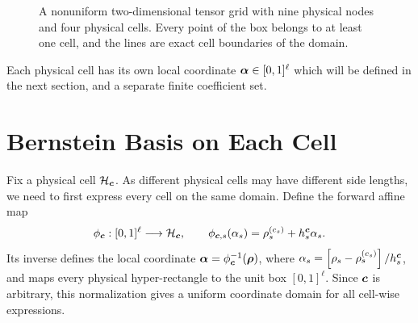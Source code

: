\begin{figure}[H]
    \centering
    \caption{A nonuniform two-dimensional tensor grid with nine physical nodes and four physical cells. Every point of the box belongs to at least one cell, and the lines are exact cell boundaries of the domain.}
    \label{fig:intro-two-dimensional-grid}
\end{figure}

Each physical cell has its own local coordinate $\boldsymbol{\alpha}\in[0,1]^\ell$ which will be defined in the next section, and a separate finite coefficient set.

\section[Bernstein Basis on Each Cell]{Bernstein Basis on Each Cell}
\label{sec:continuous-bernstein-representation}

Fix a physical cell $\mathcal H_{\boldsymbol{c}}$. As different physical cells may have different side lengths, we need to first express every cell on the same domain. Define the forward affine map
\begin{gather*}
    \phi_{\boldsymbol{c}}:[0,1]^\ell\longrightarrow\mathcal H_{\boldsymbol{c}},
    \qquad
    \phi_{\boldsymbol{c},s}(\alpha_s)
    =\rho_s^{(c_s)}+h_s^{\boldsymbol{c}}\alpha_s.
\end{gather*}
Its inverse defines the local coordinate $\boldsymbol{\alpha}=\phi_{\boldsymbol{c}}^{-1}(\boldsymbol{\rho})$, where $\alpha_s=\left[\rho_s-\rho_s^{(c_s)}\right]/h_s^{\boldsymbol{c}}$, and maps every physical hyper-rectangle to the unit box $[0,1]^\ell$. Since $\boldsymbol{c}$ is arbitrary, this normalization gives a uniform coordinate domain for all cell-wise expressions.


